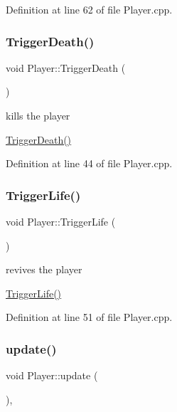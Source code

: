 Definition at line 62 of file Player.\+cpp.

\mbox{\label{class_player_a14d08591258cea6406002cda8a075917}} 
\subsubsection{\texorpdfstring{Trigger\+Death()}{TriggerDeath()}}
{\footnotesize\ttfamily void Player\+::\+Trigger\+Death (\begin{DoxyParamCaption}{ }\end{DoxyParamCaption})}



kills the player 

\hyperlink{class_player_a14d08591258cea6406002cda8a075917}{Trigger\+Death()} 

Definition at line 44 of file Player.\+cpp.

\mbox{\label{class_player_aa1452815f38bc6b069f2fda6819b2887}} 
\subsubsection{\texorpdfstring{Trigger\+Life()}{TriggerLife()}}
{\footnotesize\ttfamily void Player\+::\+Trigger\+Life (\begin{DoxyParamCaption}{ }\end{DoxyParamCaption})}



revives the player 

\hyperlink{class_player_aa1452815f38bc6b069f2fda6819b2887}{Trigger\+Life()} 

Definition at line 51 of file Player.\+cpp.

\mbox{\label{class_player_a6912bb6e48efb5845d59f0f4582827ef}} 
\subsubsection{\texorpdfstring{update()}{update()}}
{\footnotesize\ttfamily void Player\+::update (\begin{DoxyParamCaption}{ }\end{DoxyParamCaption})\hspace{0.3cm}{\ttfamily [override]}, {\ttfamily [virtual]}}



